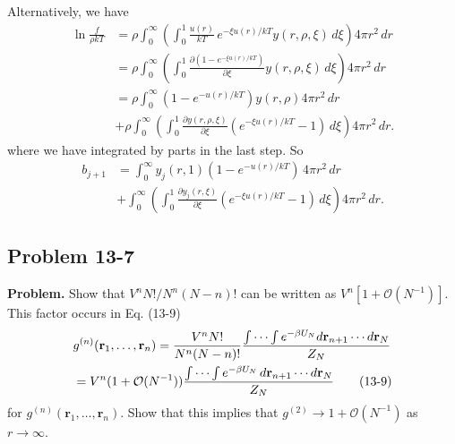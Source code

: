 \documentclass[twocolumn, 10pt]{article}
\numberwithin{equation}{section}
\newenvironment{problem}
{\par\medskip \color{problue}
  \textbf{Problem. }\ignorespaces}
{\medskip}
\newenvironment{solution}[1][\empty]
{\par\medskip\sffamily
  \textbf{\ifx\empty#1{Solution.}\relax\else{#1}\fi} \ignorespaces}
{\medskip}
\begin{document}
\begin{solution}
  Alternatively,
  we have
  \begin{align*}
    \ln \frac{ f } { \rho k T }
    &=
    \rho
    \int_0^\infty
    \left(
      \int_0^1
      \frac{u(r)} {kT} \, e^{-\xi u(r)/kT}
      y(r, \rho, \xi) \, d\xi \right)
     4 \pi r^2 \, dr
    \\
    &=
    \rho
    \int_0^\infty
    \left(
      \int_0^1
      \frac{ \partial (1 - e^{-\xi u(r)/kT}) } { \partial \xi }
      y(r, \rho, \xi) \, d\xi
    \right)
     4 \pi r^2 \, dr
    \\
    &=
    \rho
    \int_0^\infty
      (1 - e^{-u(r)/kT})
      y(r, \rho)
     4 \pi r^2 \, dr
    \\
    &+\rho
    \int_0^\infty
    \left(
      \int_0^1
      \frac{ \partial y(r, \rho, \xi) } { \partial \xi}
      (e^{-\xi u(r)/kT} - 1)
      \, d\xi \right)
     4 \pi r^2 \, dr
    .
  \end{align*}
  where we have integrated by parts in the last step.
  So
  \begin{align*}
    b_{j+1}
    &=
    \int_0^\infty
      y_j(r, 1) (1 - e^{-u(r)/kT})
      \, 4 \pi r^2 \, dr
    \\
    &+
    \int_0^\infty
      \left(
        \int_0^1 \frac{ \partial y_j(r, \xi) } { \partial \xi}
        (e^{-\xi u(r)/kT} - 1) \, d\xi
      \right)
    4 \pi r^2 \, dr
    .
  \end{align*}
\end{solution}


\subsection{Problem 13-7}

\begin{problem}
  Show that $V^n N! / N^n (N-n)!$
  can be written as $V^n[1 + \mathcal O(N^{-1})]$.
  This factor occurs in Eq. (13-9)
  \begin{align}
    &g^{(n)}(\mathbf r_1, \dots, \mathbf r_n)
    =
    \frac{ V^n N! } { N^n (N-n)! }
    \frac{
      \int\cdots\int e^{-\beta U_N} d\mathbf r_{n+1}\cdots d\mathbf r_N
    } { Z_N }
    \notag
    \\
    &=
    V^n(1 + \mathcal O(N^{-1}))
    \frac{
      \int\cdots\int e^{-\beta U_N} \, d\mathbf r_{n+1}\cdots d\mathbf r_N
    } { Z_N }
    \label{eq:gn_def}
    \tag{13-9}
  \end{align}
  for $g^{(n)}(\mathbf r_1, \dots, \mathbf r_n)$.
  Show that this implies that
  $g^{(2)} \to 1 + \mathcal O(N^{-1})$ as $r \to \infty$.
\end{problem}
\end{document}
